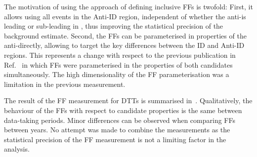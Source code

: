 {  %


  The motivation of using the approach of defining inclusive FFs is twofold:
  First, it allows using all events in the Anti-ID region, independent of
  whether the anti-\tauhadvis is leading or sub-leading in \pT, thus improving
  the statistical precision of the background estimate. Second, the FFs can be
  parameterised in properties of the anti-\tauhadvis directly, allowing to
  target the key differences between the ID and Anti-ID regions. This represents
  a change with respect to the previous publication in
  Ref.~\cite{HIGG-2016-16-witherratum} in which FFs were parameterised in the
  properties of both \tauhadvis candidates simultaneously. The high
  dimensionality of the FF parameterisation was a limitation in the previous
  measurement.}


The result of the FF measurement for DTTs is summarised
in~. Qualitatively, the behaviour of the FFs with
respect to \tauhadvis candidate properties is the same between data-taking
periods. Minor differences can be observed when comparing FFs between years. No
attempt was made to combine the measurements as the statistical precision of the
FF measurement is not a limiting factor in the analysis.

